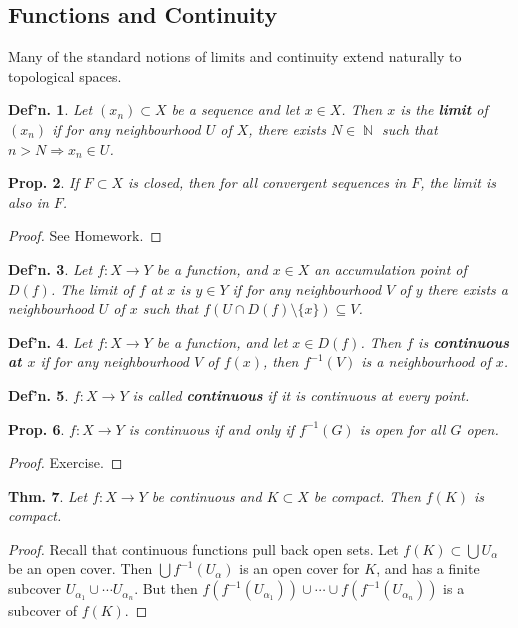 \documentclass[12pt, a4paper]{book}
\DeclareMathOperator{\N}{\mathbb{N}}
\newtheorem{theorem}{Thm.}[section]
\newtheorem{definition}[theorem]{Def'n.}
\newtheorem{proposition}[theorem]{Prop.}
\theoremstyle{nonumberplain}
\newtheorem{proof}{Proof}
\begin{document}
\subsection{Functions and Continuity}
Many of the standard notions of limits and continuity extend naturally to topological spaces.
\begin{definition}
    Let $(x_n)\subset X$ be a sequence and let $x\in X$.
    Then $x$ is the \textbf{limit} of $(x_n)$ if for any neighbourhood $U$ of $X$, there exists $N\in\N$ such that $n>N\Rightarrow x_n\in U$.
\end{definition}
\begin{proposition}
    If $F\subset X$ is closed, then for all convergent sequences in $F$, the limit is also in $F$.
\end{proposition}
\begin{proof}
    See Homework.
\end{proof}
\begin{definition}
    Let $f:X\to Y$ be a function, and $x\in X$ an accumulation point of $D(f)$.
    The limit of $f$ at $x$ is $y\in Y$ if for any neighbourhood $V$ of $y$ there exists a neighbourhood $U$ of $x$ such that $f(U\cap D(f)\setminus\{x\})\subseteq V$.
\end{definition}
\begin{definition}
    Let $f:X\to Y$ be a function, and let $x\in D(f)$.
    Then $f$ is \textbf{continuous at $x$} if for any neighbourhood $V$ of $f(x)$, then $f^{-1}(V)$ is a neighbourhood of $x$.
\end{definition}
\begin{definition}
    $f:X\to Y$ is called \textbf{continuous} if it is continuous at every point.
\end{definition}
\begin{proposition}
    $f:X\to Y$ is continuous if and only if $f^{-1}(G)$ is open for all $G$ open.
\end{proposition}
\begin{proof}
    Exercise.
\end{proof}
\begin{theorem}
    Let $f:X\to Y$ be continuous and $K\subset X$ be compact.
    Then $f(K)$ is compact.
\end{theorem}
\begin{proof}
    Recall that continuous functions pull back open sets.
    Let $f(K)\subset\bigcup U_\alpha$ be an open cover.
    Then $\bigcup f^{-1}(U_\alpha)$ is an open cover for $K$, and has a finite subcover $U_{\alpha_1}\cup\cdots U_{\alpha_n}$.
    But then $f(f^{-1}(U_{\alpha_1}))\cup\cdots \cup f(f^{-1}(U_{\alpha_n}))$ is a subcover of $f(K)$.
\end{proof}
\end{document}
